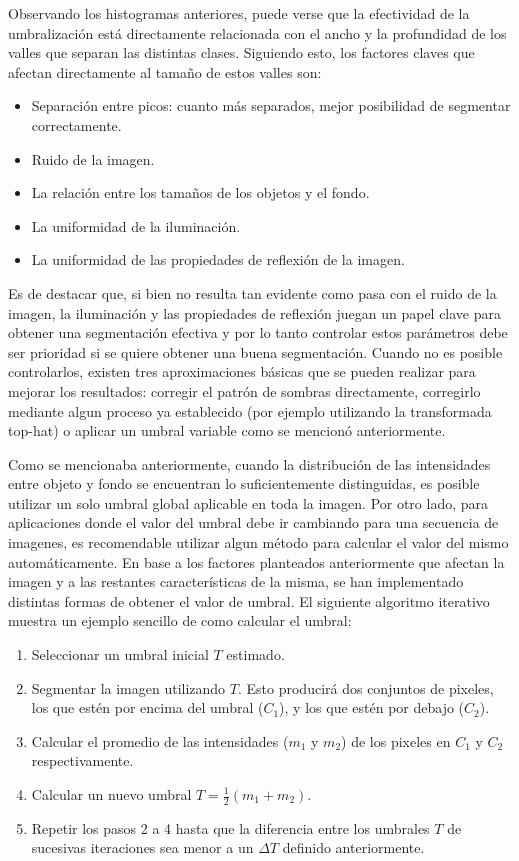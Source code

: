 Observando los histogramas anteriores, puede verse que la efectividad de la umbralización está directamente relacionada con el ancho y la profundidad de los valles que separan las distintas clases. Siguiendo esto, los factores claves que afectan directamente al tamaño de estos valles son:
\begin{itemize}
\item Separación entre picos: cuanto más separados, mejor posibilidad de segmentar correctamente.
\item Ruido de la imagen.
\item La relación entre los tamaños de los objetos y el fondo.
\item La uniformidad de la iluminación.
\item La uniformidad de las propiedades de reflexión de la imagen.
\end{itemize}

Es de destacar que, si bien no resulta tan evidente como pasa con el ruido de la imagen, la iluminación y las propiedades de reflexión juegan un papel clave para obtener una segmentación efectiva y por lo tanto controlar estos parámetros debe ser prioridad si se quiere obtener una buena segmentación. Cuando no es posible controlarlos, existen tres aproximaciones básicas que se pueden realizar para mejorar los resultados: corregir el patrón de sombras directamente, corregirlo mediante algun proceso ya establecido (por ejemplo utilizando la transformada top-hat\cite{tophat}) o aplicar un umbral variable como se mencionó anteriormente.


Como se mencionaba anteriormente, cuando la distribución de las intensidades entre objeto y fondo se encuentran lo suficientemente distinguidas, es posible utilizar un solo umbral global aplicable en toda la imagen. Por otro lado, para aplicaciones donde el valor del umbral debe ir cambiando para una secuencia de imagenes, es recomendable utilizar algun método para calcular el valor del mismo automáticamente. En base a los factores planteados anteriormente que afectan la imagen y a las restantes características de la misma, se han implementado distintas formas de obtener el valor de umbral. El siguiente algoritmo iterativo muestra un ejemplo sencillo de como calcular el umbral:

\begin{enumerate}
\item Seleccionar un umbral inicial $T$ estimado.
\item Segmentar la imagen utilizando $T$. Esto producirá dos conjuntos de pixeles, los que estén por encima del umbral ($C_1$), y los que estén por debajo ($C_2$).
\item Calcular el promedio de las intensidades ($m_1$ y $m_2$) de los pixeles en $C_1$ y $C_2$ respectivamente.
\item Calcular un nuevo umbral $T = \frac{1}{2}(m_1 + m_2)$.
\item Repetir los pasos 2 a 4 hasta que la diferencia entre los umbrales $T$ de sucesivas iteraciones sea menor a un ${\Delta}T$ definido anteriormente.
\end{enumerate}

